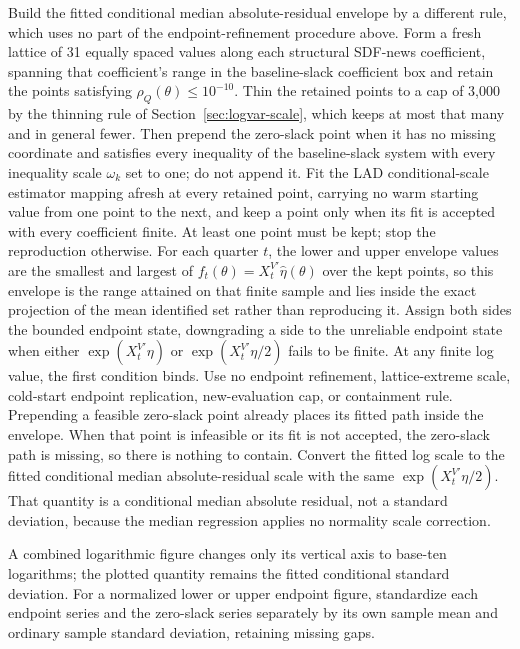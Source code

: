 \documentclass[11pt]{article}
\begin{document}
Build the fitted conditional median absolute-residual envelope by a different rule, which uses no
part of the endpoint-refinement procedure above. Form a fresh lattice of 31 equally spaced values
along each structural SDF-news coefficient, spanning that coefficient's range in the baseline-slack
coefficient box and retain the points satisfying \(\rho_Q(\theta)\le10^{-10}\). Thin the retained
points to a cap of 3,000 by the thinning rule of Section~\ref{sec:logvar-scale}, which keeps at most
that many and in general fewer. Then prepend the zero-slack point when it has no missing coordinate
and satisfies every inequality
of the baseline-slack system with every inequality scale \(\omega_k\) set to one; do not append it. Fit the
LAD conditional-scale estimator mapping afresh at every retained point, carrying no warm
starting value from one point to the next, and keep a point only when its fit is accepted with every
coefficient finite. At least one point must be kept; stop the reproduction otherwise. For each
quarter \(t\), the lower and upper envelope values are the smallest and largest of
\(f_t(\theta)=X_t^{V\prime}\widehat\eta(\theta)\) over the kept points, so this envelope is the range
attained on that finite sample and lies inside the exact projection of the mean identified set rather
than reproducing it. Assign both sides the bounded endpoint state, downgrading a side to the
unreliable endpoint state when either \(\exp(X_t^{V\prime}\eta)\) or \(\exp(X_t^{V\prime}\eta/2)\)
fails to be finite. At any finite log value, the first condition binds. Use no
endpoint refinement, lattice-extreme scale, cold-start endpoint replication,
new-evaluation cap, or containment rule. Prepending a feasible zero-slack point already places its
fitted path inside the envelope. When that point is infeasible or its fit is not accepted, the
zero-slack path is missing, so there is nothing to contain. Convert the fitted log scale to the fitted conditional median
absolute-residual scale with the same \(\exp(X_t^{V\prime}\eta/2)\). That quantity is a conditional
median absolute residual, not a standard deviation, because the median regression applies no
normality scale correction.

A combined logarithmic figure changes only its vertical axis to base-ten
logarithms; the plotted quantity remains the fitted conditional standard deviation. For a normalized lower or upper endpoint
figure, standardize each endpoint series and the zero-slack series separately by its own sample mean
and ordinary sample standard deviation, retaining missing gaps.
\end{document}
